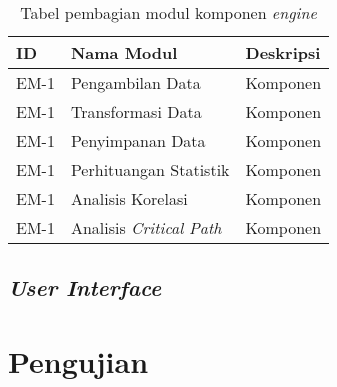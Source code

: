 \begin{small}
	\begin{longtable}{ | p{1cm} | p{3cm} | p{8cm} | }
		\caption{Tabel pembagian modul komponen \textit{engine}}
		\label{engine-module}                                                           
		\\ \hline
		\centering\bfseries{ID} & \centering\bfseries{Nama Modul} & \centering\bfseries{Deskripsi} \tabularnewline \hline
		\endfirsthead
		EM-1 & Pengambilan Data & Komponen \\ \hline
		EM-1 & Transformasi Data & Komponen \\ \hline
		EM-1 & Penyimpanan Data & Komponen \\ \hline
		EM-1 & Perhituangan Statistik & Komponen \\ \hline
		EM-1 & Analisis Korelasi & Komponen \\ \hline
		EM-1 & Analisis \textit{Critical Path} & Komponen \\ \hline
	\end{longtable}
\end{small}

%		

\subsection{\textit{User Interface}}


\section{Pengujian}
